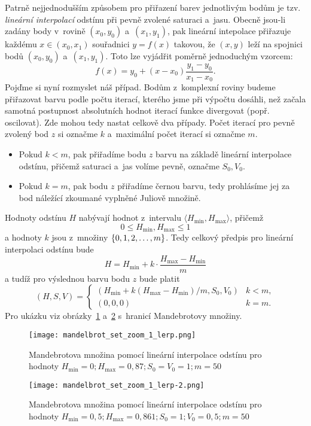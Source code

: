 Patrně nejjednodušším způsobem pro přiřazení barev jednotlivým bodům je tzv. \emph{lineární interpolací} odstínu při pevně zvolené saturaci a~jasu. Obecně jsou-li zadány body v~rovině $(x_0,y_0)$ a~$(x_1,y_1)$, pak lineární intepolace přiřazuje každému $x\in(x_0,x_1)$ souřadnici $y=f(x)$ takovou, že $(x,y)$ leží na spojnici bodů $(x_0,y_0)$ a~$(x_1,y_1)$. Toto lze vyjádřit poměrně jednoduchým vzorcem:
\[f(x)=y_{0}+(x-x_{0}){\frac {y_{1}-y_{0}}{x_{1}-x_{0}}}.\]
Pojďme si nyní rozmyslet náš případ. Bodům z~komplexní roviny budeme přiřazovat barvu podle počtu iterací, kterého jsme při výpočtu dosáhli, než začala samotná postupnost absolutních hodnot iterací funkce divergovat (popř. oscilovat). Zde mohou tedy nastat celkově dva případy. Počet iterací pro pevně zvolený bod $z$ si označme $k$ a~maximální počet iterací si označme $m$.
\begin{itemize}
    \item Pokud $k<m$, pak přiřadíme bodu $z$ barvu na základě lineární interpolace odstínu, přičemž saturaci a~jas volíme pevně, označme $S_0,V_0$.
    \item Pokud $k=m$, pak bodu $z$ přiřadíme černou barvu, tedy prohlásíme jej za bod náležící zkoumané vyplněné Juliově množině.
\end{itemize}

Hodnoty odstínu $H$ nabývají hodnot z~intervalu $\langle H_{\text{min}},H_{\text{max}}\rangle$, přičemž
\[0\leqslant H_{\text{min}},H_{\text{max}}\leqslant 1\]
a hodnoty $k$ jsou z~množiny $\left\{0,1,2,\ldots,m\right\}$. Tedy celkový předpis pro lineární interpolaci odstínu bude
\[H=H_{\text{min}}+k\cdot\frac{H_{\text{max}}-H_{\text{min}}}{m}\]
a tudíž pro výslednou barvu bodu $z$ bude platit 
\[(H,S,V)=\begin{cases}
    \left(H_{\text{min}}+k(H_{\text{max}}-H_{\text{min}})/m,S_0,V_0\right) & k<m,\\
    (0,0,0) & k=m.
\end{cases}\]
Pro ukázku viz obrázky~\ref{fig:mandelbrotova-mnozina-lerp-1} a~\ref{fig:mandelbrotova-mnozina-lerp-2} s~hranicí Mandebrotovy množiny.
\begin{figure}[h]
    \centering
    \texttt{[image: mandelbrot\_set\_zoom\_1\_lerp.png]}
    \caption{Mandebrotova množina pomocí lineární interpolace odstínu pro hodnoty $H_{\text{min}}=0;H_{\text{max}}=0{,}87;S_0=V_0=1;m=50$}
    \label{fig:mandelbrotova-mnozina-lerp-1}
\end{figure}
\begin{figure}[h]
    \centering
    \texttt{[image: mandelbrot\_set\_zoom\_1\_lerp-2.png]}
    \caption{Mandebrotova množina pomocí lineární interpolace odstínu pro hodnoty $H_{\text{min}}=0{,}5;H_{\text{max}}=0{,}861;S_0=1;V_0=0{,}5;m=50$}
    \label{fig:mandelbrotova-mnozina-lerp-2}
\end{figure}

